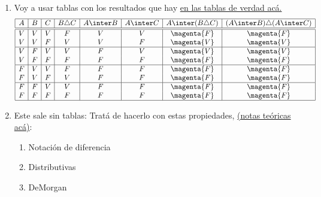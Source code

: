 \begin{enumerate}[label=\roman*)]
  \item\label{ej-14-1:itemi}
        Voy a usar tablas con los resultados que hay \hyperlink{teoria-1:tablasDeVerdad}{en las tablas de verdad acá.}
        $$
          \begin{array}{|c|c|c|c|c|c|c|c|}
            \hline
            A & B & C & B \triangle C & A \inter B & A \inter C & A \inter (B \triangle C) & (A \inter B) \triangle (A \inter C) \\
            \hline  \hline
            V & V & V & F             & V          & V          & \magenta{F}              & \magenta{F}                         \\
            V & V & F & V             & V          & F          & \magenta{V}              & \magenta{V}                         \\
            \hline
            V & F & V & V             & F          & V          & \magenta{V}              & \magenta{V}                         \\
            V & F & F & F             & F          & F          & \magenta{F}              & \magenta{F}                         \\
            \hline
            F & V & V & F             & F          & F          & \magenta{F}              & \magenta{F}                         \\
            F & V & F & V             & F          & F          & \magenta{F}              & \magenta{F}                         \\
            \hline
            F & F & V & V             & F          & F          & \magenta{F}              & \magenta{F}                         \\
            F & F & F & F             & F          & F          & \magenta{F}              & \magenta{F}                         \\
            \hline
          \end{array}
        $$

  \item Este sale sin tablas:
        Tratá de hacerlo con estas propiedades, \hyperlink{teoria-1:basicos-conjuntos}{(notas teóricas acá)}:
        \begin{enumerate}[label=\arabic*)]
          \item Notación de diferencia
          \item Distributivas
          \item DeMorgan
        \end{enumerate}


\end{enumerate}
